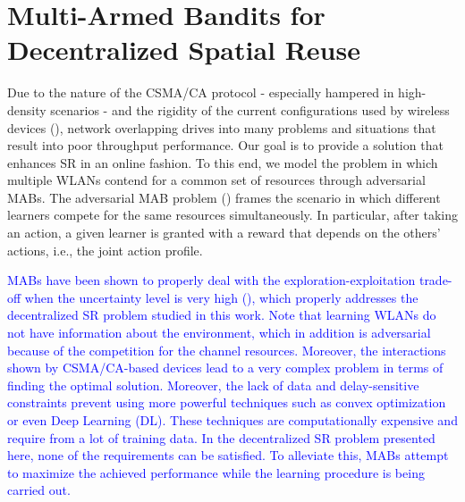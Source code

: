 \documentclass[preprint,12pt]{elsarticle}
\begin{document}
\section{Multi-Armed Bandits for Decentralized Spatial Reuse}
\label{section:mabs}
Due to the nature of the CSMA/CA protocol - especially hampered in high-density scenarios - and the rigidity of the current configurations used by wireless devices (\citealp{akella2007self}), network overlapping drives into many problems and situations that result into poor throughput performance. Our goal is to provide a solution that enhances SR in an online fashion. To this end, we model the problem in which multiple WLANs contend for a common set of resources through adversarial MABs. The adversarial MAB problem (\citealp{auer1995gambling}) frames the scenario in which different learners compete for the same resources simultaneously. In particular, after taking an action, a given learner is granted with a reward that depends on the others' actions, i.e., the joint action profile. 

\textcolor{blue}{MABs have been shown to properly deal with the exploration-exploitation trade-off when the uncertainty level is very high (\citealp{auer2002finite, audibert2009exploration, scott2010modern}), which properly addresses the decentralized SR problem studied in this work. Note that learning WLANs do not have information about the environment, which in addition is adversarial because of the competition for the channel resources. Moreover, the interactions shown by CSMA/CA-based devices lead to a very complex problem in terms of finding the optimal solution. Moreover, the lack of data and delay-sensitive constraints prevent using more powerful techniques such as convex optimization or even Deep Learning (DL). These techniques are computationally expensive and require from a lot of training data. In the decentralized SR problem presented here, none of the requirements can be satisfied. To alleviate this, MABs attempt to maximize the achieved performance while the learning procedure is being carried out.}
\end{document}
